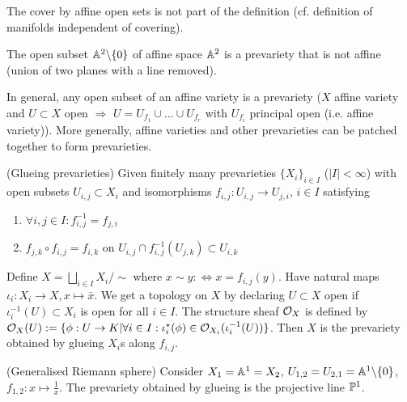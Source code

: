 \documentclass[a4paper,11pt]{article}
\begin{document}
			\begin{remark}
				The cover by affine open sets is not part of the definition (cf. definition of manifolds independent of covering).
			\end{remark}

			\begin{eg}
				The open subset $\AA^2\backslash\{0\}$ of affine space $\AA^2$ is a prevariety that is not affine (union of two planes with a line removed).
			\end{eg}

			In general, any open subset of an affine variety is a prevariety ($X$ affine variety and $U\subset X$ open $\Longrightarrow$ $U=U_{f_1}\cup\dots\cup U_{f_r}$ with $U_{f_i}$ principal open (i.e. affine variety)). More generally, affine varieties and other prevarieties can be patched together to form prevarieties.
			
			\begin{defi}(Glueing prevarieties)
				Given finitely many prevarieties $\{X_i\}_{i\in I}$	($|I|<\infty$) with open subsets $U_{i,j}\subset X_i$ and isomorphisms $f_{i,j}:U_{i,j}\rightarrow U_{j,i}$, $i\in I$ satisfying
				\begin{enumerate}
					\item $\forall i,j\in I:f_{i,j}^{-1}=f_{j,i}$
					\item $f_{j,k}\circ f_{i,j}=f_{i,k}$ on $U_{i,j}\cap f_{i,j}^{-1}(U_{j,k})\subset U_{i,k}$
				\end{enumerate}
				\noindent Define $X=\bigsqcup_{i\in I}X_i/\sim$ where $x\sim y:\Longleftrightarrow x=f_{i,j}(y)$. Have natural maps $\iota_i:X_i\rightarrow X,x\mapsto\bar{x}$. We get a topology on $X$ by declaring $U\subset X$ open if $\iota_i^{-1}(U)\subset X_i$ is open for all $i\in I$. The structure sheaf $\O_X$ is defined by $\O_X(U):=\{\phi:U\rightarrow K|\forall i\in I:\iota_i^\ast(\phi)\in\O_{X_i}(\iota_i^{-1}(U))\}$. Then $X$ is the prevariety obtained by glueing $X_i$s along $f_{i,j}$.
			\end{defi}

			\begin{eg}
				(Generalised Riemann sphere) Consider $X_1=\AA^1=X_2$, $U_{1,2}=U_{2,1}=\AA^1\backslash\{0\}$, $f_{1,2}:x\mapsto\frac{1}{x}$. The prevariety obtained by glueing is the projective line $\P^1$.
				\begin{center}
				\end{center}
			\end{eg}
\end{document}
